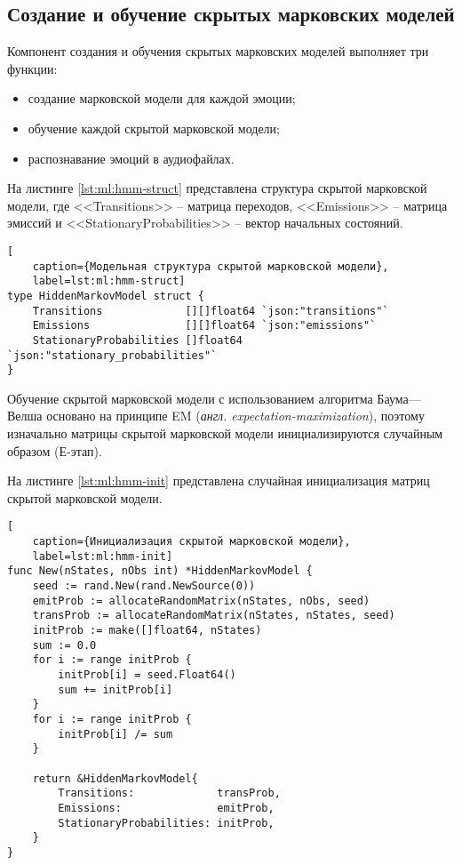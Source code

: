 \subsection{Создание и обучение скрытых марковских моделей}
Компонент создания и обучения скрытых марковских моделей выполняет три функции:
\begin{itemize}
	\item создание марковской модели для каждой эмоции;
	\item обучение каждой скрытой марковской модели;
	\item распознавание эмоций в аудиофайлах.
\end{itemize}
На листинге \ref{lst:ml:hmm-struct} представлена структура скрытой марковской модели, где <<Transitions>> -- матрица переходов, <<Emissions>> -- матрица эмиссий и <<StationaryProbabilities>> -- вектор начальных состояний.
\begin{lstlisting}[
	caption={Модельная структура скрытой марковской модели},
	label=lst:ml:hmm-struct]
type HiddenMarkovModel struct {
    Transitions             [][]float64 `json:"transitions"`
    Emissions               [][]float64 `json:"emissions"`
    StationaryProbabilities []float64   `json:"stationary_probabilities"`
}
\end{lstlisting}
Обучение скрытой марковской модели с использованием алгоритма Баума---Велша основано на принципе EM (\textit{англ. expectation-maximization}), поэтому изначально матрицы скрытой марковской модели инициализируются случайным образом (Е-этап).

На листинге \ref{lst:ml:hmm-init} представлена случайная инициализация матриц скрытой марковской модели.
\begin{lstlisting}[
	caption={Инициализация скрытой марковской модели},
	label=lst:ml:hmm-init]
func New(nStates, nObs int) *HiddenMarkovModel {
    seed := rand.New(rand.NewSource(0))
    emitProb := allocateRandomMatrix(nStates, nObs, seed)
    transProb := allocateRandomMatrix(nStates, nStates, seed)
    initProb := make([]float64, nStates)
    sum := 0.0
    for i := range initProb {
        initProb[i] = seed.Float64()
        sum += initProb[i]
    }
    for i := range initProb {
        initProb[i] /= sum
    }

    return &HiddenMarkovModel{
        Transitions:             transProb,
        Emissions:               emitProb,
        StationaryProbabilities: initProb,
    }
}
\end{lstlisting}

